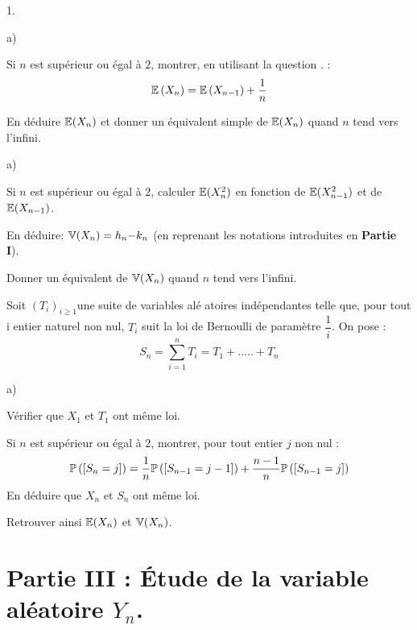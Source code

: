 \documentclass[11pt]{article}%
\begin{document}
\begin{noliste}{1.}
\item
\begin{noliste}{a)}
\item Si $n$ est supérieur ou égal à $2$, montrer, en utilisant la 
question . :%
\[
\mathbb{E}\left( X_{n}\right) =\mathbb{E}\left( X_{n-1}\right) +\dfrac{1}{n}
\]

\item En déduire $\mathbb{E}(X_{n})$ et donner un équivalent simple de 
$\mathbb{E}(X_{n})$
quand $n$ tend vers l'infini.
\end{noliste}

\item 
\begin{noliste}{a)}
\item Si $n$ est supérieur ou égal à $2$, calculer $\mathbb{E}(X_{n}^{2})$ en
fonction de $\mathbb{E}(X_{n-1}^{2})$ et de $\mathbb{E}(X_{n-1})$.

\item En déduire: $\mathbb{V}(X_{n})=h_{n}{-}k_{n}$ (en reprenant les notations
introduites en \textbf{Partie I}).

\item Donner un équivalent de $\mathbb{V}(X_{n})$ quand $n$ tend vers l'infini.
\end{noliste}

\item Soit $\left( T_{i}\right) _{i\geqslant 1}$une suite de variables 
alé%
atoires indépendantes telle que, pour tout i entier naturel non nul, 
$T_{i}$
suit la loi de Bernoulli de paramètre $\dfrac{1}{i}$. On pose : 
\[
S_{n}=\sum\limits_{i=1}^{n}T_{i}=T_{1}+.....+T_{n}
\]

\begin{noliste}{a)}
\item Vérifier que $X_{1}$ et $T_{1}$ ont même loi.

\item Si $n$ est supérieur ou égal à $2$, montrer, pour tout entier $j$ 
non nul :%
\[
\Prob\left(\Ev{S_{n}=j}\right) =\dfrac{1}{n}\Prob\left( 
\Ev{S_{n-1}=j-1}\right) +\dfrac{n-1}{n%
} \Prob\left(\Ev{S_{n-1}=j}\right)
\]
En déduire que $X_{n}$ et $S_{n}$ ont même loi.

\item Retrouver ainsi $\mathbb{E}(X_{n})$ et $\mathbb{V}(X_{n})$.
\end{noliste}
\end{noliste}

\section*{Partie III : Étude de la variable aléatoire $Y_{n}$.}
\end{document}
